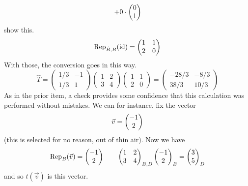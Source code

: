 \begin{exercises}
\begin{answer}
\begin{exparts}
\begin{equation*}
                  +0\cdot\colvec{0 \\ 1}
      \end{equation*}
      show this.
      \begin{equation*}
        \rep{\identity}{\hat{B},B}=\begin{pmatrix}
          1  &1  \\
          2  &0
        \end{pmatrix}
      \end{equation*}
      With those, the conversion goes in this way.
      \begin{equation*}
        \hat{T}=\begin{pmatrix}
          1/3  &-1  \\
          1/3  &1
        \end{pmatrix}
        \begin{pmatrix}
          1  &2  \\
          3  &4
        \end{pmatrix}
        \begin{pmatrix}
          1  &1  \\
          2  &0
        \end{pmatrix}
        =\begin{pmatrix}
          -28/3  &-8/3  \\
          38/3   &10/3
        \end{pmatrix}
      \end{equation*}
      As in the prior item, a check provides some confidence that this
      calculation was performed without mistakes.
      We can for instance, fix the vector
      \begin{equation*}
        \vec{v}=\colvec{-1 \\ 2}
      \end{equation*}
      (this is selected for no reason, out of thin air).
      Now we have
      \begin{equation*}
        \rep{\vec{v}}{B}=\colvec{-1 \\ 2}
        \qquad
        \begin{pmatrix}
          1  &2  \\
          3  &4
        \end{pmatrix}_{B,D}
        \colvec{-1  \\ 2}_{B}
        =\colvec{3  \\ 5}_D
      \end{equation*}
      and so $t(\vec{v})$ is this vector.
      \begin{equation*}

\end{equation*}
\end{exparts}
\end{answer}
\end{exercises}
